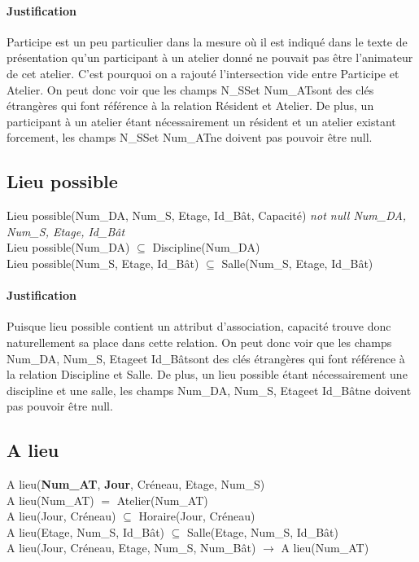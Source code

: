 \documentclass[a4paper, 12pt]{article}
\begin{document}
            \paragraph{Justification}Participe est un peu particulier dans la mesure où il est indiqué dans le texte de présentation qu'un participant à un atelier donné ne pouvait pas être l'animateur de cet atelier. C'est pourquoi on a rajouté l'intersection vide entre Participe et Atelier. On peut donc voir que les champs \og N\_SS\fg et \og Num\_AT\fg sont des clés étrangères qui font référence à la relation Résident et Atelier. 
            De plus, un participant à un atelier étant nécessairement un résident et un atelier existant forcement, les champs \og N\_SS\fg et \og Num\_AT\fg ne doivent pas pouvoir être null.   

        \subsection{Lieu possible}
            \noindent Lieu possible(Num\_DA, Num\_S, Etage, Id\_Bât, Capacité) \textit{not null Num\_DA, Num\_S, Etage, Id\_Bât} \\
            Lieu possible(Num\_DA) $\subseteq$ Discipline(Num\_DA) \\
            Lieu possible(Num\_S, Etage, Id\_Bât) $\subseteq$ Salle(Num\_S, Etage, Id\_Bât)
            \paragraph{Justification}Puisque lieu possible contient un attribut d'association, capacité trouve donc naturellement sa place dans cette relation. On peut donc voir que les champs \og Num\_DA\fg, \og Num\_S\fg, \og Etage\fg et \og Id\_Bât\fg sont des clés étrangères qui font référence à la relation Discipline et Salle. De plus, un lieu possible étant nécessairement une discipline et une salle, les champs \og Num\_DA\fg, \og Num\_S\fg, \og Etage\fg et \og Id\_Bât\fg ne doivent pas pouvoir être null.
        
        \subsection{A lieu}
            \noindent A lieu(\textbf{Num\_AT}, \textbf{Jour}, Créneau, Etage, Num\_S) \\
            A lieu(Num\_AT) $=$ Atelier(Num\_AT) \\
            A lieu(Jour, Créneau) $\subseteq$ Horaire(Jour, Créneau) \\
            A lieu(Etage, Num\_S, Id\_Bât) $\subseteq$ Salle(Etage, Num\_S, Id\_Bât) \\
            A lieu(Jour, Créneau, Etage, Num\_S, Num\_Bât) $\rightarrow$ A lieu(Num\_AT)
\end{document}
